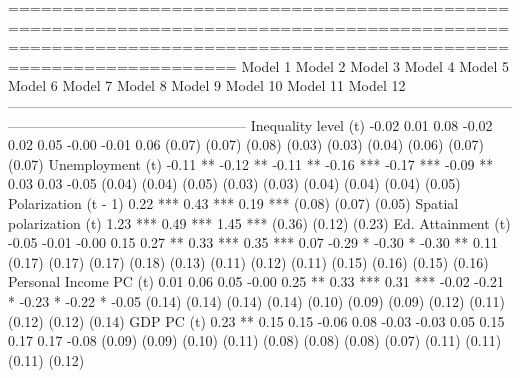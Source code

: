 
===============================================================================================================================================================
                          Model 1    Model 2    Model 3    Model 4     Model 5    Model 6     Model 7     Model 8     Model 9   Model 10  Model 11   Model 12  
---------------------------------------------------------------------------------------------------------------------------------------------------------------
Inequality level (t)       -0.02                  0.01       0.08       -0.02                   0.02        0.05       -0.00               -0.01       0.06    
                           (0.07)                (0.07)     (0.08)      (0.03)                 (0.03)      (0.04)      (0.06)              (0.07)     (0.07)   
Unemployment (t)                      -0.11 **   -0.12 **   -0.11 **               -0.16 ***   -0.17 ***   -0.09 **               0.03      0.03      -0.05    
                                      (0.04)     (0.04)     (0.05)                 (0.03)      (0.03)      (0.04)                (0.04)    (0.04)     (0.05)   
Polarization (t - 1)                                         0.22 ***                                       0.43 ***                                   0.19 ***
                                                            (0.08)                                         (0.07)                                     (0.05)   
Spatial polarization (t)                                     1.23 ***                                       0.49 ***                                   1.45 ***
                                                            (0.36)                                         (0.12)                                     (0.23)   
Ed. Attainment (t)         -0.05      -0.01      -0.00       0.15        0.27 **    0.33 ***    0.35 ***    0.07       -0.29 *   -0.30 *   -0.30 **    0.11    
                           (0.17)     (0.17)     (0.17)     (0.18)      (0.13)     (0.11)      (0.12)      (0.11)      (0.15)    (0.16)    (0.15)     (0.16)   
Personal Income PC (t)      0.01       0.06       0.05      -0.00        0.25 **    0.33 ***    0.31 ***   -0.02       -0.21 *   -0.23 *   -0.22 *    -0.05    
                           (0.14)     (0.14)     (0.14)     (0.14)      (0.10)     (0.09)      (0.09)      (0.12)      (0.11)    (0.12)    (0.12)     (0.14)   
GDP PC (t)                  0.23 **    0.15       0.15      -0.06        0.08      -0.03       -0.03        0.05        0.15      0.17      0.17      -0.08    
                           (0.09)     (0.09)     (0.10)     (0.11)      (0.08)     (0.08)      (0.08)      (0.07)      (0.11)    (0.11)    (0.11)     (0.12)   
